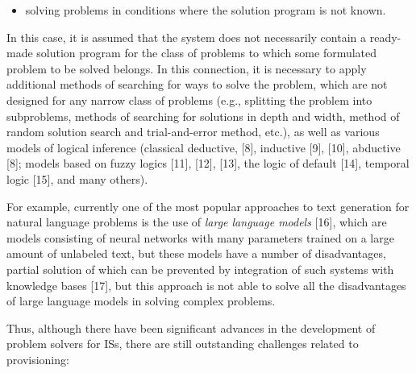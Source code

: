 \documentclass[10pt, a4paper]{article}
\begin{document}
\begin{multicols}{2}
\begin{itemize}[itemsep=0pt]
 The systems oriented on such approach to problem
 solving include systems using:
 \begin{itemize}
     \item [-]programs written in both imperative and declarative programming languages, including logical and functional programming [2];
     \item [-]genetic algorithm implementations [3], [4];
     \item [-]neural network models of knowledge processing
 [5], [6], [7].
 \end{itemize}
  It should be noted that even in the case of using a stored program, the solution of the problem is not always trivial, because, first, it is required to find such a stored program on the basis of some specification, and second, to provide its interpretation;
    \item solving problems in conditions where the solution
 program is not known.
\end{itemize}
 \noindent In this case, it is assumed that the system does not necessarily contain a ready-made solution program for the class of problems to which some formulated problem to be solved belongs. In this connection, it is necessary to apply additional methods of searching for ways to solve the problem, which are not designed for any narrow class of problems (e.g., splitting the problem into subproblems, methods of searching for solutions in depth and width, method of random solution search and trial-and-error method, etc.), as well as various models of logical inference (classical deductive, [8], inductive [9], [10], abductive [8]; models based on fuzzy logics [11], [12], [13], the logic of default [14], temporal logic [15], and many others).
\par For example, currently one of the most popular approaches to text generation for natural language problems is the use of \textit{large language models} [16], which are models consisting of neural networks with many parameters trained on a large amount of unlabeled text, but these models have a number of disadvantages, partial solution of which can be prevented by integration of such systems with knowledge bases [17], but this approach is not able to solve all the disadvantages of large language models in solving complex problems.
 \par Thus, although there have been significant advances in the development of problem solvers for ISs, there are still outstanding challenges related to provisioning:
 \begin{itemize}

\end{itemize}
\end{multicols}
\end{document}
